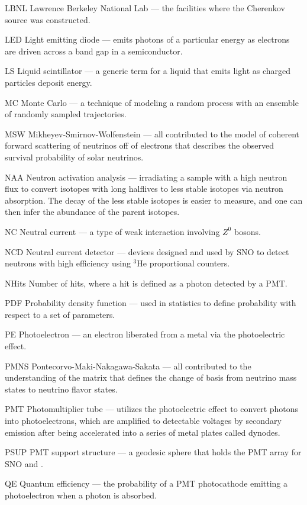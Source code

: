 \begin{labeling}{{\labppo}}
\item[LBNL] Lawrence Berkeley National Lab --- the facilities where the Cherenkov source was constructed.
\item[LED] Light emitting diode --- emits photons of a particular energy as electrons are driven across a band gap in a semiconductor.
\item[LS] Liquid scintillator --- a generic term for a liquid that emits light as charged particles deposit energy.
\item[MC] Monte Carlo --- a technique of modeling a random process with an ensemble of randomly sampled trajectories.
\item[MSW] Mikheyev-Smirnov-Wolfenstein --- all contributed to the model of coherent forward scattering of neutrinos off of electrons that describes the observed survival probability of solar neutrinos.
\item[NAA] Neutron activation analysis --- irradiating a sample with a high neutron flux to convert isotopes with long halflives to less stable isotopes via neutron absorption. The decay of the less stable isotopes is easier to measure, and one can then infer the abundance of the parent isotopes. 
\item[NC] Neutral current --- a type of weak interaction involving $Z^0$ bosons.
\item[NCD] Neutral current detector --- devices designed and used by SNO to detect neutrons with high efficiency using $^3$He proportional counters.
\item[NHits] Number of hits, where a hit is defined as a photon detected by a PMT.
\item[PDF] Probability density function --- used in statistics to define probability with respect to a set of parameters.
\item[PE] Photoelectron --- an electron liberated from a metal via the photoelectric effect.
\item[PMNS] Pontecorvo-Maki-Nakagawa-Sakata --- all contributed to the understanding of the matrix that defines the change of basis from neutrino mass states to neutrino flavor states.
\item[PMT] Photomultiplier tube --- utilizes the photoelectric effect to convert photons into photoelectrons, which are amplified to detectable voltages by secondary emission after being accelerated into a series of metal plates called dynodes.
\item[PSUP] PMT support structure ---  a geodesic sphere that holds the PMT array for SNO and {\snop}.
\item[QE] Quantum efficiency --- the probability of a PMT photocathode emitting a photoelectron when a photon is absorbed.

\end{labeling}
